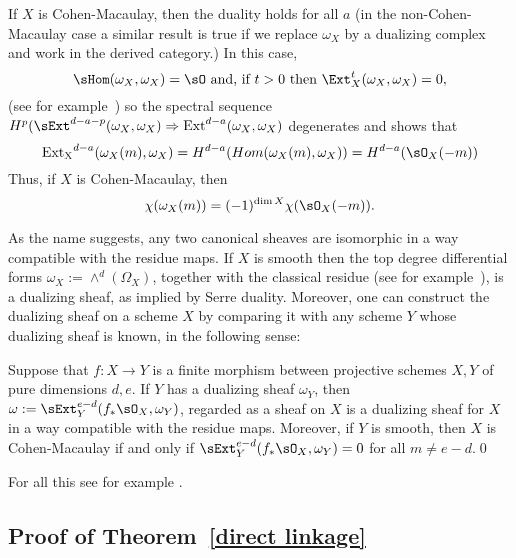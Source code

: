 \begin{fact}
If $X$ is Cohen-Macaulay, then the duality holds for all $a$ (in the non-Cohen-Macaulay case a similar result is true if we replace $\omega_X$ by a dualizing complex
and work in the derived category.) In this case, 
$$
\sHom(\omega_X, \omega_X) = \sO \hbox{ and, if $t>0$ then } \Ext_X^{t}(\omega_X, \omega_X) = 0,
$$
(see for example~\cite[Theorem[Theorems 3.3.4 and 3.3.10d]{BrunsHerzog}) so the spectral sequence $H^p(\sExt^{d-a-p}(\omega_X, \omega_X) \Rightarrow {\rm Ext}^{d-a}(\omega_X, \omega_X)$ degenerates and shows that 
$$
{\rm Ext_X}^{d-a}(\omega_X(m), \omega_X) = H^{d-a}(Hom(\omega_X(m), \omega_X)) = H^{d-a}(\sO_X(-m))
$$
Thus, if $X$ is Cohen-Macaulay, then 
$$
\chi(\omega_X(m)) =(-1)^{\dim X}\chi(\sO_X(-m)).
$$

As the name suggests, any two canonical sheaves are isomorphic in a way compatible with the
residue maps. If $X$ is smooth then the top degree differential forms $\omega_X :=\wedge^d(\Omega_X)$,
together with the classical residue (see for example~\cite[p. 648, 708]{Griffiths-Harris1978}), is a dualizing sheaf, as implied by Serre duality. Moreover, one can construct the dualizing sheaf on a scheme
$X$ by comparing it with any scheme $Y$ whose dualizing sheaf is known, in the following sense:

\begin{theorem}\label{omega}\label{general adjunction}
Suppose that $f: X\to Y$ is a finite morphism between projective schemes $X,Y$ of pure dimensions $d,e$. If $Y$ has a dualizing sheaf $\omega_Y$,
then $\omega := \sExt_Y^{e-d}(f_*\sO_X,  \omega_Y)$, regarded as a sheaf on $X$ is a dualizing sheaf for $X$ in a way compatible with the residue maps.
Moreover, if $Y$ is smooth, then $X$ is Cohen-Macaulay if and only if $ \sExt_Y^{e-d}(f_*\sO_X,  \omega_Y)= 0$ for all $m\neq e-d$.\qed
\end{theorem}

For all this see for example \cite{AltmanKleiman}.
\end{fact}


\subsection{Proof of Theorem~\ref{direct linkage}}

